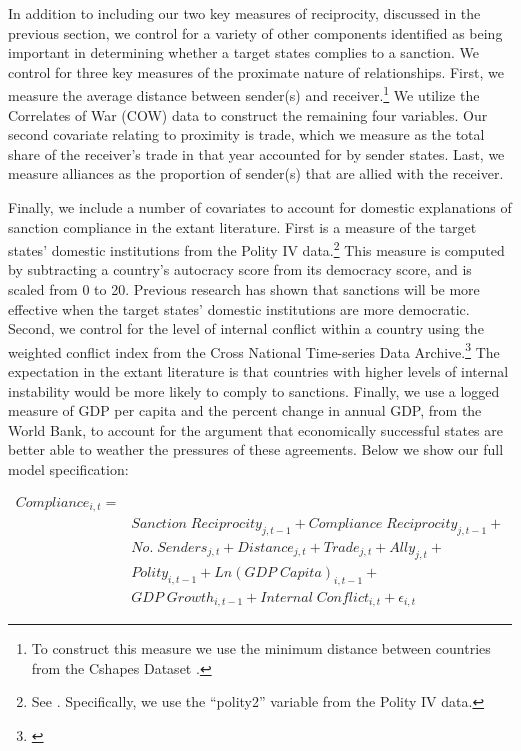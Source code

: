 In addition to including our two key measures of reciprocity, discussed in the previous section, we control for a variety of other components identified as being important in determining whether a target states complies to a sanction. We control for three key measures of the proximate nature of relationships. First, we measure the average distance between sender(s) and receiver.\footnote{To construct this measure we use the minimum distance between countries from the Cshapes Dataset \citep{weidmann2010geography}.} We utilize the Correlates of War (COW) data to construct the remaining four variables. Our second covariate relating to proximity is trade, which we measure as the total share of the receiver's trade in that year accounted for by sender states. Last, we measure alliances as the proportion of sender(s) that are allied with the receiver. 

Finally, we include a number of covariates to account for domestic explanations of sanction compliance in the extant literature. First is a measure of the target states' domestic institutions from the Polity IV data.\footnote{See \cite{marshall2002polity}. Specifically, we use the ``polity2'' variable from the Polity IV data.} This measure is computed by subtracting a country's autocracy score from its democracy score, and is scaled from 0 to 20. Previous research has shown that sanctions will be more effective when the target states' domestic institutions are more democratic. Second, we control for the level of internal conflict within  a country using the weighted conflict index from the Cross National Time-series Data Archive.\footnote{\cite{banks2011cross}} The expectation in the extant literature is that countries with higher levels of internal instability would be more likely to comply to sanctions. Finally, we use a logged measure of GDP per capita and the percent change in annual GDP, from the World Bank, to account for the argument that economically successful states are better able to weather the pressures of these agreements.
Below we show our full model specification: 

\begin{align*}
		Compliance_{i,t} =& \\
		&Sanction \; Reciprocity_{j,t-1} + Compliance \; Reciprocity_{j,t-1} + \\
		&No. \; Senders_{j,t} + Distance_{j,t} + Trade_{j,t} + Ally_{j,t} + \\
		&Polity_{i,t-1} + Ln(GDP \; Capita)_{i,t-1} +\\
		&GDP \; Growth_{i,t-1} + Internal \; Conflict_{i,t} + \epsilon_{i,t}
\end{align*}

